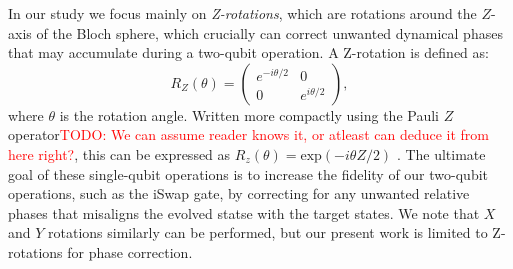 \documentclass{subfiles}
\begin{document}
In our study we focus mainly on \emph{Z-rotations}, which are rotations around the $Z$-axis of the Bloch sphere, which crucially can correct unwanted dynamical phases that may accumulate during a two-qubit operation. A Z-rotation is defined as:
\begin{equation}
    R_Z(\theta) = \begin{pmatrix}
    e^{-i\theta/2} & 0 \\
    0 & e^{i\theta/2}
    \end{pmatrix} \label{eq:z_rotation_gate},
\end{equation}
where $\theta$ is the rotation angle. Written more compactly using the Pauli $Z$ operator\textcolor{red}{TODO: We can assume reader knows it, or atleast can deduce it from here right?}, this can be expressed as $R_z(\theta) = \text{exp}(-i\theta Z/2)$ \cite{nielsen2010quantum}. The ultimate goal of these single-qubit operations is to increase the fidelity of our two-qubit operations, such as the iSwap gate, by correcting for any unwanted relative phases that misaligns the evolved statse with the target states. We note that $X$ and $Y$ rotations similarly can be performed, but our present work is limited to Z-rotations for phase correction.
\end{document}
